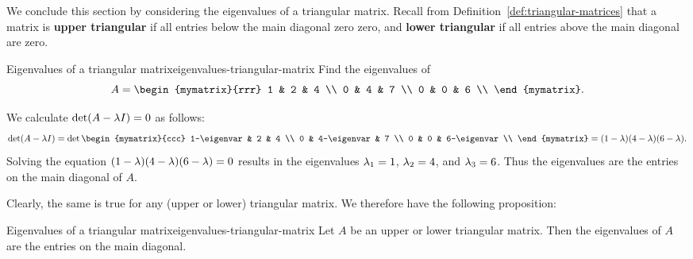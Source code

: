 We conclude this section by considering the eigenvalues of a
triangular matrix. Recall from
Definition~\ref{def:triangular-matrices} that a matrix is
\textbf{upper triangular}%
%
%
%
%
if all entries below the main diagonal zero
zero, and \textbf{lower triangular}%
%
if all entries above the main
diagonal are zero.

\begin{example}{Eigenvalues of a triangular matrix}{eigenvalues-triangular-matrix}
  Find the eigenvalues of
  \begin{equation*}
    A=\begin{mymatrix}{rrr}
      1 & 2 & 4 \\
      0 & 4 & 7 \\
      0 & 0 & 6 \\
    \end{mymatrix}.
  \end{equation*}
\end{example}

\begin{solution}
  We calculate $\det(A - \lambda I) = 0$ as follows:
  \begin{eqnarray*}
    \det (A - \eigenvar I) =
    \det \begin{mymatrix}{ccc}
      1-\eigenvar & 2 & 4 \\
      0 & 4-\eigenvar & 7 \\
      0 & 0 & 6-\eigenvar \\
    \end{mymatrix} = (1-\eigenvar)(4-\eigenvar)(6-\eigenvar).
  \end{eqnarray*}
  Solving the equation $(1-\lambda)(4-\lambda)(6-\lambda) = 0$
  results in the eigenvalues $\lambda_1 = 1$, $\lambda_2 = 4$, and
  $\lambda_3 = 6$.  Thus the eigenvalues are the entries on the main
  diagonal of $A$.
\end{solution}

Clearly, the same is true for any (upper or lower) triangular
matrix. We therefore have the following proposition:

\begin{proposition}{Eigenvalues of a triangular matrix}{eigenvalues-triangular-matrix}
  Let $A$ be an upper or lower triangular matrix. Then the eigenvalues
  of $A$ are the entries on the main diagonal.
\end{proposition}
